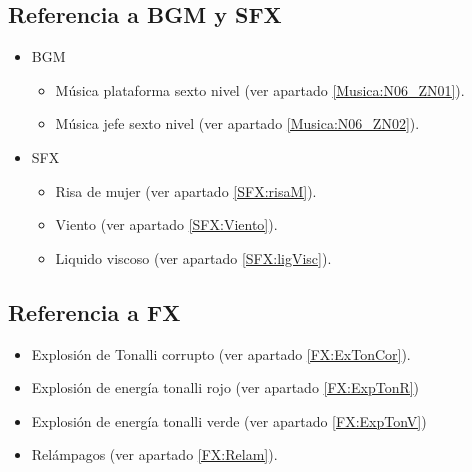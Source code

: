 	\subsection{Referencia a BGM y SFX}
	\begin{itemize}
		\item BGM
			\begin{itemize}
				\item Música plataforma sexto nivel (ver apartado \ref{Musica:N06_ZN01}).
				\item Música jefe sexto nivel (ver apartado \ref{Musica:N06_ZN02}).
			\end{itemize}
		\item SFX
		\begin{itemize}
			\item Risa de mujer (ver apartado \ref{SFX:risaM}).
			\item Viento (ver apartado \ref{SFX:Viento}).
			\item Liquido viscoso (ver apartado \ref{SFX:ligVisc}).
		\end{itemize}
	\end{itemize}
	\subsection{Referencia a FX}
	\begin{itemize}
		\item Explosión de Tonalli corrupto (ver apartado \ref{FX:ExTonCor}).
		\item Explosión de energía tonalli rojo (ver apartado \ref{FX:ExpTonR})
	\item Explosión de energía tonalli verde (ver apartado \ref{FX:ExpTonV})
	\item Relámpagos (ver apartado \ref{FX:Relam}).
	\end{itemize}
	